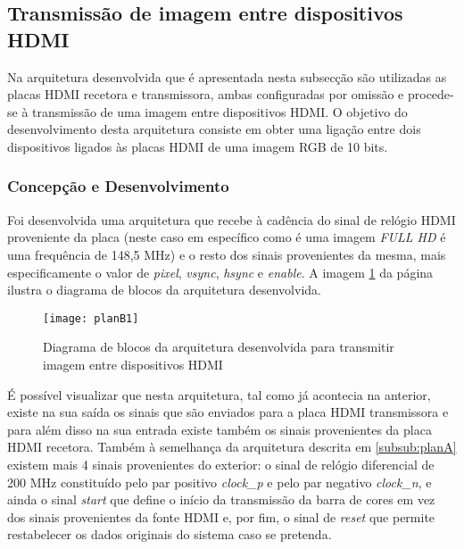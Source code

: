 \subsection{Transmissão de imagem entre dispositivos HDMI} \label{subsub:planB}

Na arquitetura desenvolvida que é apresentada nesta subsecção são utilizadas as placas HDMI recetora e transmissora, ambas configuradas por omissão e procede-se à transmissão de uma imagem entre dispositivos HDMI. O objetivo do desenvolvimento desta arquitetura consiste em obter uma ligação entre dois dispositivos ligados às placas HDMI de uma imagem RGB de 10 bits.

\subsubsection*{Concepção e Desenvolvimento}

Foi desenvolvida uma arquitetura que recebe à cadência do sinal de relógio HDMI proveniente da placa (neste caso em específico como é uma imagem \textit{FULL HD} é uma frequência de 148,5 MHz) e o resto dos sinais provenientes da mesma, mais especificamente o valor de \textit{pixel}, \textit{vsync}, \textit{hsync} e \textit{enable}. A imagem \ref{fig:planb1} da página \pageref{fig:planb1} ilustra o diagrama de blocos da arquitetura desenvolvida.

\begin{figure}[h!]
	\begin{center}
		\leavevmode
		\texttt{[image: planB1]}
		\caption{Diagrama de blocos da arquitetura desenvolvida para transmitir imagem entre dispositivos HDMI}
		\label{fig:planb1}
	\end{center}
\end{figure}

É possível visualizar que nesta arquitetura, tal como já acontecia na anterior, existe na sua saída os sinais que são enviados para a placa HDMI transmissora e para além disso na sua entrada existe também os sinais provenientes da placa HDMI recetora. Também à semelhança da arquitetura descrita em \ref{subsub:planA} existem mais 4 sinais provenientes do exterior: o sinal de relógio diferencial de 200 MHz constituído pelo par positivo \textit{clock\_p} e pelo par negativo \textit{clock\_n}, e ainda o sinal \textit{start} que define o início da transmissão da barra de cores em vez dos sinais provenientes da fonte HDMI e, por fim, o sinal de \textit{reset} que permite restabelecer os dados originais do sistema caso se pretenda.

